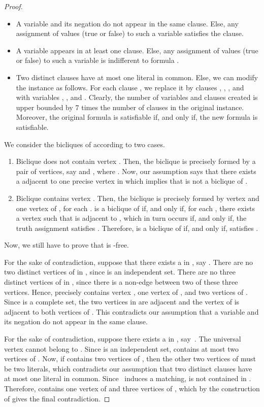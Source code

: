 \documentclass{article}
\begin{document}
\begin{proof}
	\begin{itemize}
	  \item A variable and its negation do not appear in the same clause. Else,
	  any assignment of values (true or false) to such a variable satisfies the
	  clause.
	  \item A variable appears in at least one clause. Else,
	  any assignment of values (true or false) to such a variable is
	  indifferent to formula .
	  \item Two distinct clauses have at most one literal in common. 
	  Else, we can modify the instance as follows. For each clause 
	  , we replace it by clauses , 
	  , ,
	  and  with variables ,
	  , and . Clearly, the number of variables and clauses created is upper
	  bounded by 7 times the number of clauses in the original instance. 
	  Moreover, the original formula is satisfiable if, and only if, the new
	  formula is satisfiable. 
	\end{itemize}    
 
	We consider the bicliques of  according to two cases.
	\begin{enumerate}
		\item Biclique  does not contain vertex . Then, the biclique is
		precisely formed by a pair of vertices, say  and ,
		where . Now, our assumption says that there exists a 
		adjacent to one precise vertex in  which implies
		that  is not a biclique of .
		\item Biclique  contains vertex . Then, the biclique is
		precisely formed by vertex  and one vertex of , for each .  is a biclique of  if, and only if, for each
		, there exists a vertex  such that  is
		adjacent to , which in turn occurs if, and only if, the truth assignment
		 satisfies . Therefore,  is a biclique of  if, and only if,
		 satisfies .
	\end{enumerate}
	
	Now, we still have to prove that  is -free. 
	
	For the sake of contradiction, suppose that there exists a  in , say
	. There are no two distinct vertices of  in , since  is an independent set. There
	are no three distinct vertices of  in , since there is a non-edge
	between two of these three vertices. Hence,  precisely contains vertex ,
	one vertex of , and two vertices of . Since  is a complete set, the
	two vertices in  are adjacent and the vertex of  is adjacent
	to both vertices of . This contradicts our assumption that a
	variable and its negation do not appear in the same clause. 
	
	For the sake of contradiction, suppose
	there exists a  in , say~. The universal vertex 
	cannot belong to . Since  is an independent set,  contains at most
	two vertices of . Now, if  contains two vertices of , then the other
	two vertices of  must be two literals, which contradicts our assumption that
	two distinct clauses have at most one literal in common. Since~
	induces a matching,  is not contained in . Therefore,  contains
	one vertex of  and three vertices of , which by the construction of
	 gives the final contradiction.	
	\end{proof}
\end{document}
